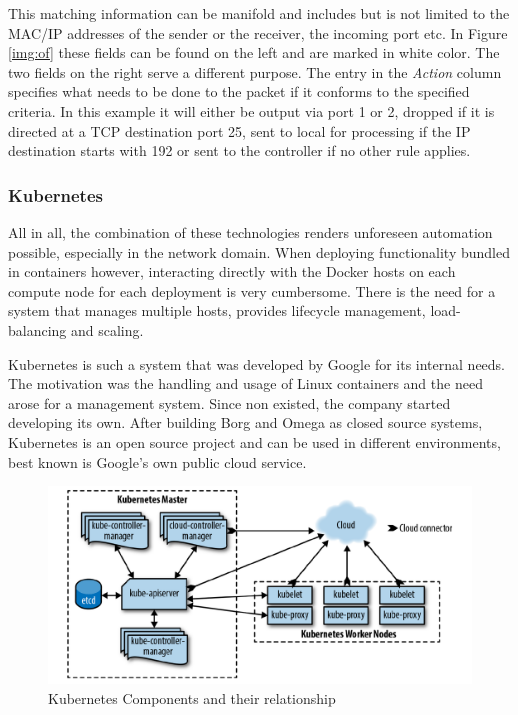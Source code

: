 This matching information can be manifold and includes but is not limited to the MAC/IP addresses of the sender or the receiver, the incoming port etc. In Figure \ref{img:of} these fields can be found on the left and are marked in white color. The two fields on the right serve a different purpose. The entry in the \textit{Action} column specifies what needs to be done to the packet if it conforms to the specified criteria. In this example it will either be output via port 1 or 2, dropped if it is directed at a TCP destination port 25, sent to local for processing if the IP destination starts with 192 or sent to the controller if no other rule applies. 

\subsubsection{Kubernetes}
All in all, the combination of these technologies renders unforeseen automation possible, especially in the network domain. When deploying functionality bundled in containers however, interacting directly with the Docker hosts on each compute node for each deployment is very cumbersome. There is the need for a system that manages multiple hosts, provides lifecycle management, load-balancing and scaling. 

Kubernetes is such a system that was developed by Google for its internal needs. The motivation was the handling and usage of Linux containers and the need arose for a management system. Since non existed, the company started developing its own. After building Borg and Omega as closed source systems, Kubernetes is an open source project and can be used in different environments, best known is Google's own public cloud service.

\begin{figure}[h]
	\includegraphics[width=\linewidth]{images/k8Arch.png}
	\caption{Kubernetes Components and their relationship \cite{k8CN}}
	\label{fig:k8}
\end{figure}


